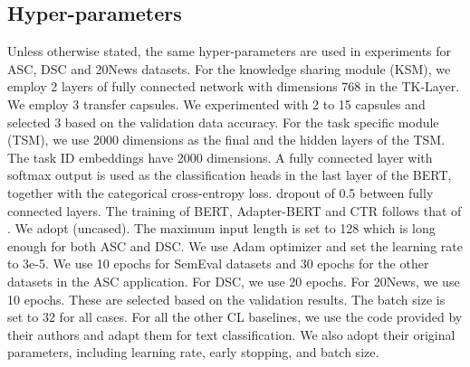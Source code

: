 \documentclass{article}
\begin{document}
\subsection{Hyper-parameters}
Unless otherwise stated, the same hyper-parameters are used in experiments for ASC, DSC and 20News datasets. For the knowledge sharing module (KSM), we employ 2 layers of fully connected network with dimensions 768 in the TK-Layer. {We employ 3 transfer capsules. We experimented with 2 to 15 capsules and selected 3 based on the validation data accuracy.} For the task specific module (TSM), {we use 
2000 dimensions as the final and the hidden layers of the TSM.} The task ID embeddings have 2000 dimensions. A fully connected layer with softmax output is used as the classification heads in the last layer of the BERT, together with the categorical cross-entropy loss.
dropout of 0.5 between fully connected layers. The training of BERT, Adapter-BERT and CTR follows that of \cite{DBLP:conf/naacl/XuLSY19}. We adopt  (uncased). The maximum input length is set to 128 which is long enough for both ASC and DSC. We use Adam optimizer and set the learning rate to 3e-5.
{We use 10 epochs for SemEval datasets and 30 epochs for the other datasets in the ASC application. For DSC, we use 20 epochs. For 20News, we use 10 epochs. These are selected based on the validation results. The batch size is set to 32 for all cases.}
For all the other CL baselines, we use the code provided by their authors and adapt them for text classification. We also adopt their original parameters, including learning rate, early stopping, and batch size. 
\end{document}
